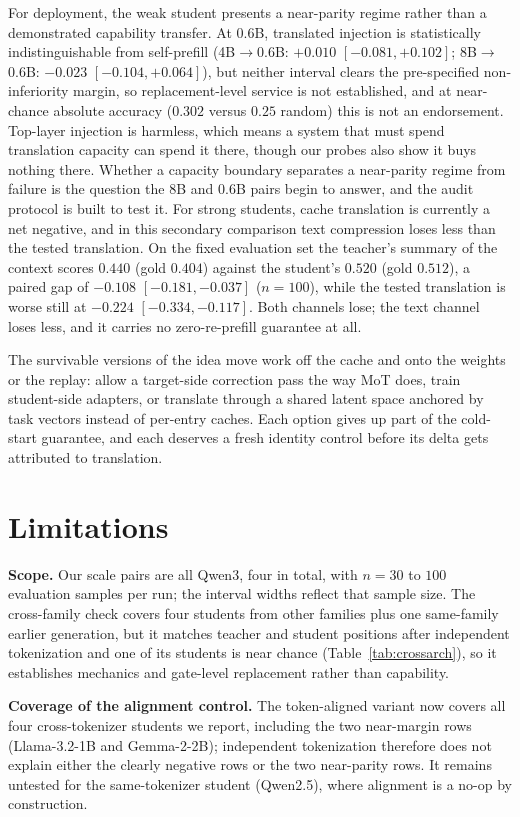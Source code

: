 \documentclass[10pt]{article}
\begin{document}
For deployment, the weak student presents a near-parity regime rather than a
demonstrated capability transfer. At 0.6B, translated injection is
statistically indistinguishable from self-prefill
(4B$\to$0.6B: $+0.010$ $[-0.081,+0.102]$; 8B$\to$0.6B: $-0.023$
$[-0.104,+0.064]$), but neither interval clears the pre-specified
non-inferiority margin, so replacement-level service is not established, and
at near-chance absolute accuracy ($0.302$ versus $0.25$ random) this is not an
endorsement. Top-layer injection is harmless, which means a system that
must spend translation capacity can spend it there, though our probes also
show it buys nothing there. Whether a capacity boundary separates a
near-parity regime from failure is the question the 8B
and 0.6B pairs begin to answer, and the audit protocol is built to test it.
For strong students, cache translation is currently a net negative, and in this
secondary comparison text compression loses less than the tested translation.
On the fixed evaluation set the teacher's summary of the context scores $0.440$
(gold $0.404$) against the student's $0.520$ (gold $0.512$), a paired gap of
$-0.108$ $[-0.181, -0.037]$ ($n{=}100$), while the tested translation is worse
still at $-0.224$ $[-0.334, -0.117]$. Both channels lose; the text channel loses
less, and it carries no zero-re-prefill guarantee at all.

The survivable versions of the idea move work off the cache and onto the
weights or the replay: allow a target-side correction pass the way MoT does,
train student-side adapters, or translate through a shared latent space
anchored by task vectors instead of per-entry caches. Each option gives up
part of the cold-start guarantee, and each deserves a fresh identity control
before its delta gets attributed to translation.

\section{Limitations}
\label{sec:limitations}
\textbf{Scope.} Our scale pairs are all Qwen3, four in total, with $n{=}30$ to
$100$ evaluation samples per run; the interval widths reflect that sample size.
The cross-family check covers four students from other families plus one
same-family earlier generation, but it matches teacher and student positions
after independent tokenization and one of its students is near chance
(Table~\ref{tab:crossarch}), so it establishes mechanics and gate-level
replacement rather than capability.

\textbf{Coverage of the alignment control.} The token-aligned variant now covers
all four cross-tokenizer students we report, including the two near-margin rows
(Llama-3.2-1B and Gemma-2-2B); independent tokenization therefore does not
explain either the clearly negative rows or the two near-parity rows. It remains
untested for the same-tokenizer student (Qwen2.5), where alignment is a no-op by
construction.
\end{document}

